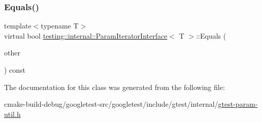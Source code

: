 \mbox{\label{classtesting_1_1internal_1_1ParamIteratorInterface_a9d811697a752d46f7bd6a0082f9040a3}} 
\subsubsection{\texorpdfstring{Equals()}{Equals()}}
{\footnotesize\ttfamily template$<$typename T$>$ \\
virtual bool \mbox{\hyperlink{classtesting_1_1internal_1_1ParamIteratorInterface}{testing\+::internal\+::\+Param\+Iterator\+Interface}}$<$ T $>$\+::Equals (\begin{DoxyParamCaption}\item[{const \mbox{\hyperlink{classtesting_1_1internal_1_1ParamIteratorInterface}{Param\+Iterator\+Interface}}$<$ T $>$ \&}]{other }\end{DoxyParamCaption}) const\hspace{0.3cm}{\ttfamily [pure virtual]}}



The documentation for this class was generated from the following file\+:\begin{DoxyCompactItemize}
\item 
cmake-\/build-\/debug/googletest-\/src/googletest/include/gtest/internal/\mbox{\hyperlink{gtest-param-util_8h}{gtest-\/param-\/util.\+h}}\end{DoxyCompactItemize}
